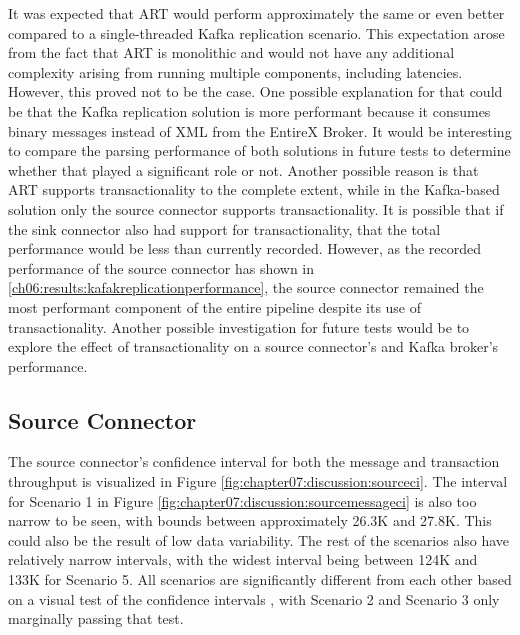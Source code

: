 It was expected that \ac{ART} would perform approximately the same or even better compared to a single-threaded Kafka replication scenario. This expectation arose from the fact that \ac{ART} is monolithic and would not have any additional complexity arising from running multiple components, including latencies. However, this proved not to be the case. One possible explanation for that could be that the Kafka replication solution is more performant because it consumes binary messages instead of XML from the EntireX Broker. It would be interesting to compare the parsing performance of both solutions in future tests to determine whether that played a significant role or not. Another possible reason is that \ac{ART} supports transactionality to the complete extent, while in the Kafka-based solution only the source connector supports transactionality. It is possible that if the sink connector also had support for transactionality, that the total performance would be less than currently recorded. However, as the recorded performance of the source connector has shown in \ref{ch06:results:kafakreplicationperformance}, the source connector remained the most performant component of the entire pipeline despite its use of transactionality. Another possible investigation for future tests would be to explore the effect of transactionality on a source connector's and Kafka broker's performance.

\subsection{Source Connector}
The source connector's confidence interval for both the message and transaction throughput is visualized in Figure \ref{fig:chapter07:discussion:sourceci}. The interval for Scenario 1 in Figure \ref{fig:chapter07:discussion:sourcemessageci} is also too narrow to be seen, with bounds between approximately 26.3K and 27.8K. This could also be the result of low data variability. The rest of the scenarios also have relatively narrow intervals, with the widest interval being between 124K and 133K for Scenario 5. All scenarios are significantly different from each other based on a visual test of the confidence intervals \cite{jain1991computer}, with Scenario 2 and Scenario 3 only marginally passing that test.

